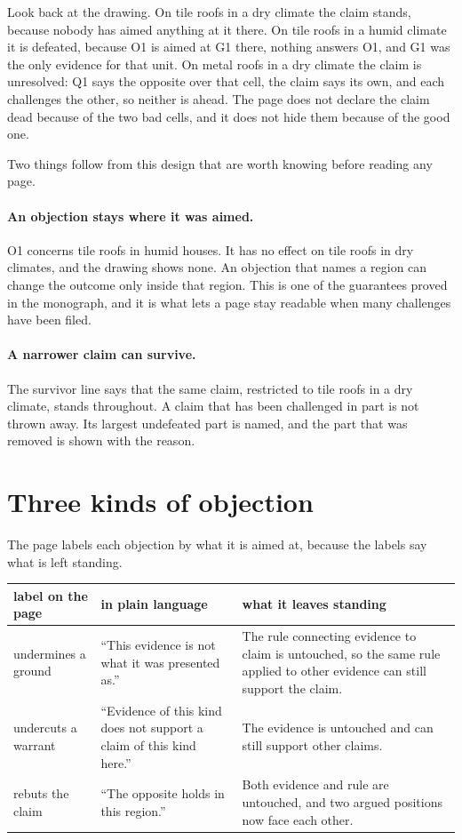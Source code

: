 \documentclass[11pt]{article}
\begin{document}
Look back at the drawing. On tile roofs in a dry climate the claim stands, because nobody has aimed anything at it there. On tile roofs in a humid climate it is defeated, because O1 is aimed at G1 there, nothing answers O1, and G1 was the only evidence for that unit. On metal roofs in a dry climate the claim is unresolved: Q1 says the opposite over that cell, the claim says its own, and each challenges the other, so neither is ahead. The page does not declare the claim dead because of the two bad cells, and it does not hide them because of the good one.

Two things follow from this design that are worth knowing before reading any page.

\paragraph{An objection stays where it was aimed.} O1 concerns tile roofs in humid houses. It has no effect on tile roofs in dry climates, and the drawing shows none. An objection that names a region can change the outcome only inside that region. This is one of the guarantees proved in the monograph, and it is what lets a page stay readable when many challenges have been filed.

\paragraph{A narrower claim can survive.} The survivor line says that the same claim, restricted to tile roofs in a dry climate, stands throughout. A claim that has been challenged in part is not thrown away. Its largest undefeated part is named, and the part that was removed is shown with the reason.

\section{Three kinds of objection}\label{sec:objections}

The page labels each objection by what it is aimed at, because the labels say what is left standing.

\begin{center}
\small
\begin{tabularx}{\textwidth}{@{}l X X@{}}
\toprule
label on the page & in plain language & what it leaves standing\\
\midrule
undermines a ground & ``This evidence is not what it was presented as.'' & The rule connecting evidence to claim is untouched, so the same rule applied to other evidence can still support the claim.\\
undercuts a warrant & ``Evidence of this kind does not support a claim of this kind here.'' & The evidence is untouched and can still support other claims.\\
rebuts the claim & ``The opposite holds in this region.'' & Both evidence and rule are untouched, and two argued positions now face each other.\\
\bottomrule
\end{tabularx}
\end{center}
\end{document}
